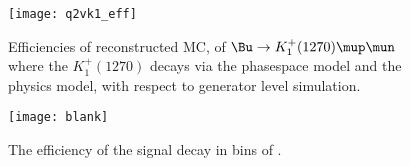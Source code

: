 



\begin{figure}[h]
  \begin{center}
    \texttt{[image: q2vk1\_eff]}
    \caption{\small Efficiencies of reconstructed MC, of $\Bu\to K_1^+(1270) \mup\mun$
      where the $K_1^+(1270)$ decays via the phasespace model and the physics model,
    with respect to generator level simulation.}
    \label{fig:q2vk1eff}
  \end{center}
\end{figure}


\begin{figure}
  \begin{center}
    \texttt{[image: blank]}
    \caption{\small
      The efficiency of the signal decay \btokphimumu in bins of \qsq.
    }
    \label{fig:hhh:phikeff}
  \end{center}
\end{figure}

